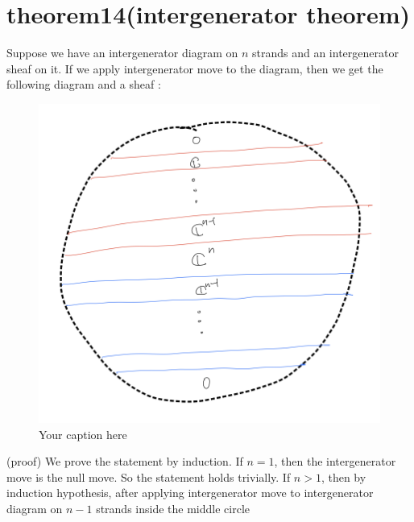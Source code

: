 \section{theorem14(intergenerator theorem)}
\begin{theorem}
\end{theorem}

Suppose we have an intergenerator diagram on $n$ strands and an intergenerator sheaf on it. If we apply intergenerator move to the diagram, then we get the following diagram and a sheaf :

\begin{figure}[H] %
    \centering
    \includegraphics[width=\linewidth]{diagrams/theorem14/1.png} %
    \caption{Your caption here}
    \label{fig:your-label}
\end{figure}

(proof) We prove the statement by induction. If $n=1$, then the intergenerator move is the null move. So the statement holds trivially. If $n>1$, then by induction hypothesis, after applying intergenerator move to intergenerator diagram on $n-1$ strands inside the middle circle

